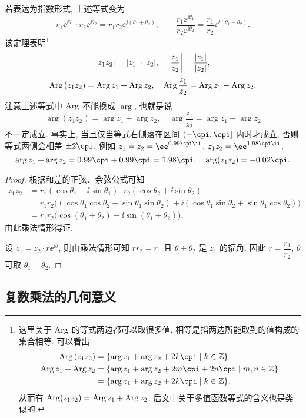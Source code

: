 若表达为指数形式, 上述等式变为
  \[
    r_1\ee^{\ii\theta_1}\cdot r_2\ee^{\ii\theta_2}=r_1r_2\ee^{\ii(\theta_1+\theta_2)},\qquad
    \frac{r_1\ee^{\ii\theta_1}}{r_2\ee^{\ii\theta_2}}=\frac{r_1}{r_2}\ee^{\ii(\theta_1-\theta_2)}.
  \]
该定理表明\footnote{%
  这里关于 $\operatorname{Arg}$ 的等式两边都可以取很多值, 相等是指两边所能取到的值构成的集合相等.
  可以看出
  \begin{align*}
    \Arg{(z_1z_2)}&
   =\{\arg z_1+\arg z_2+2k\cpi\mid k\in\BZ\}\\
   \Arg z_1 +\Arg z_2&
   =\{\arg z_1+\arg z_2+2m\cpi+2n\cpi\mid m,n\in\BZ\}\\&
   =\{\arg z_1+\arg z_2+2k\cpi\mid k\in\BZ\},
  \end{align*}
  从而有 $\operatorname{Arg}(z_1z_2)=\operatorname{Arg} z_1+\operatorname{Arg} z_2$.
  后文中关于多值函数等式的含义也是类似的.
}
\[
  |z_1z_2|=|z_1|\cdot|z_2|,\quad
  \left|\frac{z_1}{z_2}\right|=\frac{|z_1|}{|z_2|},
\]
\begin{equation}
  \label{eq:Arg-multiply-divide-equality}
  \operatorname{Arg}{(z_1z_2)}=\operatorname{Arg} z_1+\operatorname{Arg} z_2,\quad
  \operatorname{Arg}{\frac{z_1}{z_2}}=\operatorname{Arg} z_1-\operatorname{Arg} z_2.
\end{equation}
注意上述等式中 $\operatorname{Arg}$ 不能换成 $\arg$, 也就是说
\[
  \arg{(z_1z_2)}=\arg z_1+\arg z_2,\quad
  \arg{\frac{z_1}{z_2}}=\arg z_1-\arg z_2
\]
\alert{不一定成立}.
事实上, 当且仅当等式右侧落在区间 $(-\cpi,\cpi]$ 内时才成立, 否则等式两侧会相差 $\pm2\cpi$.
例如 $z_1=z_2=\ee^{0.99\cpi \ii}$, $z_1z_2=\ee^{1.98\cpi \ii}$,
\[
  \arg z_1+\arg z_2=0.99\cpi+0.99\cpi=1.98\cpi,\quad
  \arg(z_1z_2)=-0.02\cpi.
\]

\begin{proof}
  根据和差的正弦、余弦公式可知
  \begin{align*}
     z_1z_2&
    =r_1(\cos\theta_1+\ii\sin\theta_1)\cdot
     r_2(\cos\theta_2+\ii\sin\theta_2)\\&
    =r_1r_2\bigl(
       (\cos\theta_1\cos\theta_2-\sin\theta_1\sin\theta_2)
    +\ii(\cos\theta_1\sin\theta_2+\sin\theta_1\cos\theta_2)
     \bigr)\\&
    =r_1r_2\bigl(
      \cos(\theta_1+\theta_2)+\ii\sin(\theta_1+\theta_2)
     \bigr),
  \end{align*}
  由此乘法情形得证.

  设 $z_1=z_2\cdot r\ee^{\ii\theta}$, 则由乘法情形可知 $rr_2=r_1$ 且 $\theta+\theta_2$ 是 $z_1$ 的辐角.
  因此 $r=\dfrac{r_1}{r_2}$, $\theta$ 可取 $\theta_1-\theta_2$.
\end{proof}


\subsection{复数乘法的几何意义}

